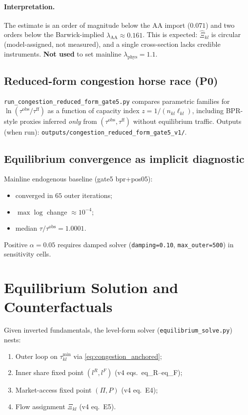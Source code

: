 \documentclass[11pt]{article}
\newcommand{\obs}{\mathrm{obs}}
\newcommand{\phys}{\mathrm{phys}}
\newcommand{\AAcal}{\mathrm{AA}}
\begin{document}
\paragraph{Interpretation.}
The estimate is an order of magnitude below the AA import ($0.071$) and
two orders below the Barwick-implied $\lambda_{\AAcal}\approx 0.161$.
This is expected: $\hat\Xi_{kl}$ is circular (model-assigned, not
measured), and a single cross-section lacks credible instruments.
\textbf{Not used} to set mainline $\lambda_{\phys}=1.1$.

\subsection{Reduced-form congestion horse race (P0)}

\texttt{run\_congestion\_reduced\_form\_gate5.py} compares parametric
families for $\ln(\tau^{\obs}/\tau^{\mathrm{ff}})$ as a function of
capacity index $z=1/(n_{kl}\ell_{kl})$, including BPR-style proxies
inferred \emph{only} from $(\tau^{\obs},\tau^{\mathrm{ff}})$ without
equilibrium traffic.  Outputs (when run):
\texttt{outputs/congestion\_reduced\_form\_gate5\_v1/}.

\subsection{Equilibrium convergence as implicit diagnostic}

Mainline endogenous baseline (gate5 bpr+pos05):
\begin{itemize}[leftmargin=2em]
  \item converged in $65$ outer iterations;
  \item $\max\log$ change $\approx 10^{-4}$;
  \item median $\tau/\tau^{\obs}=1.0001$.
\end{itemize}
Positive $\alpha=0.05$ requires damped solver
(\texttt{damping=0.10}, \texttt{max\_outer=500}) in sensitivity cells.

\section{Equilibrium Solution and Counterfactuals}\label{sec:equilibrium}

Given inverted fundamentals, the level-form solver
(\texttt{equilibrium\_solve.py}) nests:
\begin{enumerate}[leftmargin=2em]
  \item Outer loop on $\tau^{\min}_{kl}$ via \eqref{eq:congestion_anchored};
  \item Inner share fixed point $(l^R,l^F)$ (v4 eqs.\ eq\_R--eq\_F);
  \item Market-access fixed point $(\Pi,P)$ (v4 eq.\ E4);
  \item Flow assignment $\Xi_{kl}$ (v4 eq.\ E5).
\end{enumerate}
\end{document}
